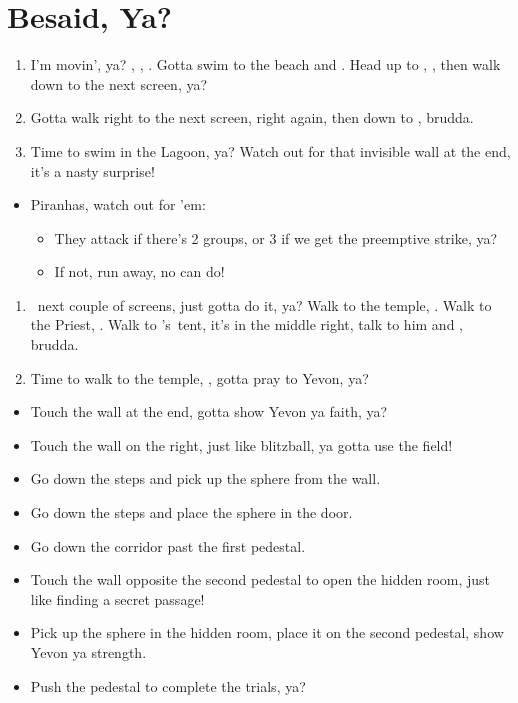 \chapter{Besaid, Ya?}

\begin{enumerate}
    \item I'm movin', ya? \cs[0:30], \sd, \fmv. Gotta swim to the beach and \sd. Head up to \wakka, \sd, then walk down to the next screen, ya?
    \item Gotta walk right to the next screen, right again, then down to \wakka, brudda.
    \item Time to swim in the Lagoon, ya? Watch out for that invisible wall at the end, it's a nasty surprise!
\end{enumerate}
\begin{encounters}
    \begin{itemize}
        \item Piranhas, watch out for 'em:
        \begin{itemize}
            \item They attack if there's 2 groups, or 3 if we get the preemptive strike, ya?
            \item If not, run away, no can do!
        \end{itemize}
    \end{itemize}
\end{encounters}
\begin{enumerate}[resume]
    \item \sd\ next couple of screens, just gotta do it, ya? Walk to the temple, \cs[0:30]. Walk to the Priest, \cs[1:30]. Walk to \wakka's\ tent, it's in the middle right, talk to him and \sd, brudda.
    \item Time to walk to the temple, \sd, gotta pray to Yevon, ya?
\end{enumerate}
\begin{trial}
    \begin{itemize}
        \item Touch the wall at the end, gotta show Yevon ya faith, ya?
        \item Touch the wall on the right, just like blitzball, ya gotta use the field!
        \item Go down the steps and pick up the sphere from the wall.
        \item Go down the steps and place the sphere in the door.
        \item Go down the corridor past the first pedestal.
        \item Touch the wall opposite the second pedestal to open the hidden room, just like finding a secret passage!
        \item Pick up the sphere in the hidden room, place it on the second pedestal, show Yevon ya strength.
        \item Push the pedestal to complete the trials, ya?
    \end{itemize}
\end{trial}
